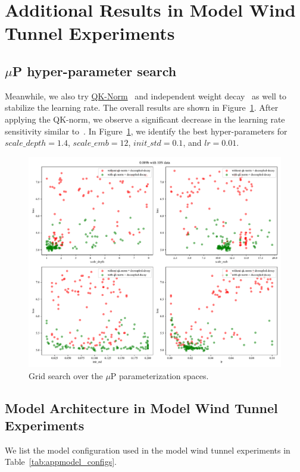 \section{Additional Results in Model Wind Tunnel Experiments}

\subsection{$\mu$P hyper-parameter search}
\label{app:bayesiansearch}
Meanwhile, we also try \uline{QK-Norm}~\citep{henry-etal-2020-query} and independent weight decay~\citep{loshchilov2017decoupled} as well to stabilize the learning rate. The overall results are shown in Figure~\ref{fig:mupsearch_app}. After applying the QK-norm, we observe a significant decrease in the learning rate sensitivity similar to~\cite{wortsman2023small}. In Figure~\ref{fig:mupsearch_app}, we identify the best hyper-parameters for $scale\_depth=1.4$, $scale\_emb=12$, $init\_std=0.1$, and $lr=0.01$. 

\begin{figure}[htbp]
    \centering
    \includegraphics[width=0.65\linewidth]{Fig/mup0.009bwith10Ndata.pdf}
    \caption{Grid search over the $\mu$P parameterization spaces.}
    \label{fig:mupsearch_app}
\end{figure}

\subsection{Model Architecture in Model Wind Tunnel Experiments}
We list the model configuration used in the model wind tunnel experiments in Table~\ref{tab:appmodel_configs}.

